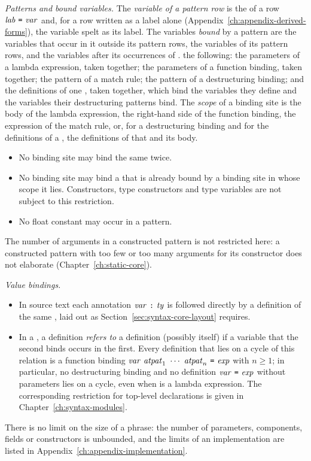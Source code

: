\emph{Patterns and bound variables.} The \emph{variable of a pattern row} is
the \var{} of a row $\lab\ \kw{=}\ \var$ and, for a row written as a label
alone (Appendix~\ref{ch:appendix-derived-forms}), the variable spelt as its
label. The variables \emph{bound} by a pattern are the variables that occur in
it outside its pattern rows, the variables of its pattern rows, and the
variables after its occurrences of . %
the following: the parameters of a lambda expression, taken together; the
parameters of a function binding, taken together; the pattern of a match
rule; the pattern of a destructuring binding; and the definitions of one
, taken together, which bind the variables they define and the
variables their destructuring patterns bind. The \emph{scope} of a binding
site is the body of the lambda expression, the right-hand side of the function
binding, the expression of the match rule, or, for a destructuring binding
and for the definitions of a , the definitions of that  and
its body.
\begin{itemize}
\item{} No binding site may bind the same \var{} twice.
\item{} No binding site may bind a \var{} that is already bound by a binding site
  in whose scope it lies. Constructors, type constructors and type variables
  are not subject to this restriction.
\item{} No float constant may occur in a pattern.
\end{itemize}
The number of arguments in a constructed pattern is not restricted here: a
constructed pattern with too few or too many arguments for its constructor
does not elaborate (Chapter~\ref{ch:static-core}).

\emph{Value bindings.}
\begin{itemize}
\item{} In source text each annotation $\var\ \kw{:}\ \ty$ is followed directly
  by a definition of the same \var, laid out as
  Section~\ref{sec:syntax-core-layout} requires.
\item{} In a , a definition \emph{refers to} a definition (possibly
  itself) if a variable that the second binds occurs in the first. Every
  definition that lies on a cycle of this relation is a function binding
  $\var\ \atpat_1\ \cdots\ \atpat_n\ \kw{=}\ \expm$ with $n \geq 1$; in
  particular, no destructuring binding and no definition
  $\mathit{var}\ \textnormal{\texttt{=}}\ \mathit{exp}$ without parameters lies on a cycle, even when \expm{}
  is a lambda expression. The corresponding restriction for top-level
  declarations is given in Chapter~\ref{ch:syntax-modules}.
\end{itemize}

There is no limit on the size of a phrase: the number of parameters,
components, fields or constructors is unbounded, and the limits of an
implementation are listed in Appendix~\ref{ch:appendix-implementation}.
